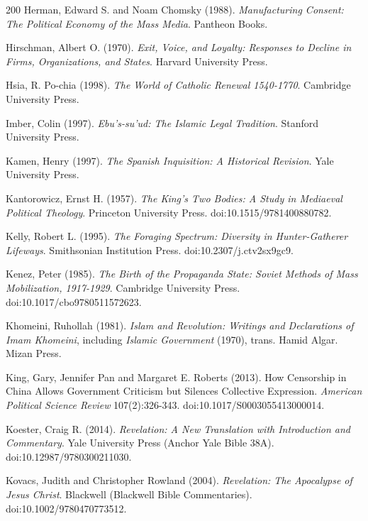 \documentclass[11pt,letterpaper]{article}
\theoremstyle{definition}
\theoremstyle{remark}
\begin{document}
\begin{thebibliography}{200}
Herman, Edward S. and Noam Chomsky (1988). \emph{Manufacturing Consent: The Political Economy of the Mass Media}. Pantheon Books.

Hirschman, Albert O. (1970). \emph{Exit, Voice, and Loyalty: Responses to Decline in Firms, Organizations, and States}. Harvard University Press.

Hsia, R. Po-chia (1998). \emph{The World of Catholic Renewal 1540-1770}. Cambridge University Press.

Imber, Colin (1997). \emph{Ebu's-su'ud: The Islamic Legal Tradition}. Stanford University Press.

Kamen, Henry (1997). \emph{The Spanish Inquisition: A Historical Revision}. Yale University Press.

Kantorowicz, Ernst H. (1957). \emph{The King's Two Bodies: A Study in Mediaeval Political Theology}. Princeton University Press. doi:10.1515/9781400880782.

Kelly, Robert L. (1995). \emph{The Foraging Spectrum: Diversity in Hunter-Gatherer Lifeways}. Smithsonian Institution Press. doi:10.2307/j.ctv2sx9gc9.

Kenez, Peter (1985). \emph{The Birth of the Propaganda State: Soviet Methods of Mass Mobilization, 1917-1929}. Cambridge University Press. doi:10.1017/cbo9780511572623.

Khomeini, Ruhollah (1981). \emph{Islam and Revolution: Writings and Declarations of Imam Khomeini}, including \emph{Islamic Government} (1970), trans. Hamid Algar. Mizan Press.

King, Gary, Jennifer Pan and Margaret E. Roberts (2013). How Censorship in China Allows Government Criticism but Silences Collective Expression. \emph{American Political Science Review} 107(2):326-343. doi:10.1017/S0003055413000014.

Koester, Craig R. (2014). \emph{Revelation: A New Translation with Introduction and Commentary}. Yale University Press (Anchor Yale Bible 38A). doi:10.12987/9780300211030.

Kovacs, Judith and Christopher Rowland (2004). \emph{Revelation: The Apocalypse of Jesus Christ}. Blackwell (Blackwell Bible Commentaries). doi:10.1002/9780470773512.


\end{thebibliography}
\end{document}
